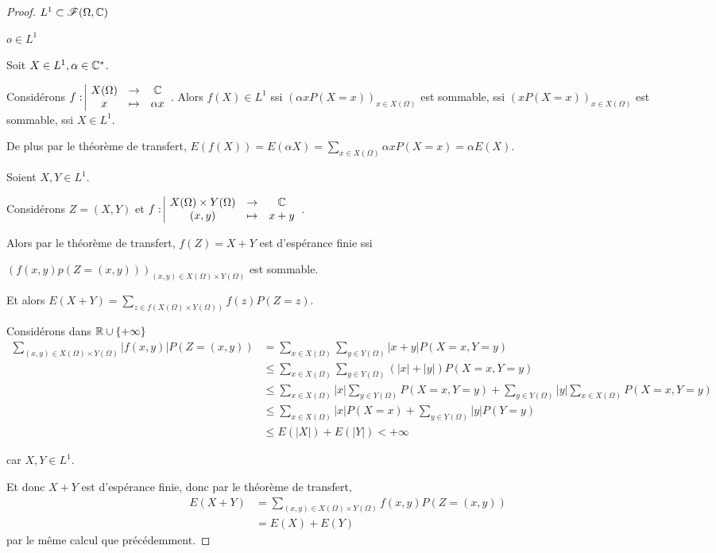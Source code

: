 \begin{proof}
    $L^1 \subset \mathscr F(\Omega, \mathbb{C})$

    $o \in L^1$

    Soit $X \in L^1, \alpha \in \mathbb{C}^*$. 

    Considérons $f: \space \begin{array}{|ccc} \displaystyle X(\Omega) & \to & \displaystyle \mathbb{C} \\ \displaystyle x & \mapsto & \displaystyle \alpha x \end{array}$.
    Alors $f(X) \in L^1$ ssi $(\alpha x P(X = x))_{x \in X(\Omega)}$ est sommable,
    ssi $(x P(X = x))_{x \in X(\Omega)}$ est sommable, ssi $X \in L^1$.

    De plus par le théorème de transfert, 
    $E(f(X)) = E(\alpha X) = \sum_{x \in X(\Omega)} \alpha x P(X = x) = \alpha E(X)$.

    \lvspace Soient $X, Y \in L^1$.

    Considérons $Z = (X, Y)$ et $f: \space \begin{array}{|ccc} \displaystyle X(\Omega) \times Y(\Omega) & \to & \displaystyle \mathbb{C} \\ \displaystyle (x, y) & \mapsto & \displaystyle x + y \end{array}$.

    Alors par le théorème de transfert, $f(Z) = X + Y$ est d'espérance finie ssi

    $(f(x, y) p(Z = (x, y)))_{(x, y) \in X(\Omega) \times Y(\Omega)}$ est sommable.

    Et alors $\displaystyle E(X + Y) = \sum_{z \in f(X(\Omega) \times Y(\Omega))} f(z) P(Z = z)$.

    Considérons dans $\mathbb{R} \cup \{+ \infty \}$ 
    \begin{align}
        \sum_{(x, y) \in X(\Omega) \times Y(\Omega)} |f(x, y)| P(Z = (x, y)) & = \sum_{x \in X(\Omega)} \sum_{y \in Y(\Omega)} |x + y| P(X = x, Y = y) \\
        & \leqslant \sum_{x \in X(\Omega)} \sum_{y \in Y(\Omega)} (|x| + |y|) P(X = x, Y = y) \\
        & \leqslant \sum_{x \in X(\Omega)} |x| \sum_{y \in Y(\Omega)} P(X = x, Y = y) + \sum_{y \in Y(\Omega)} |y| \sum_{x \in X(\Omega)} P(X = x, Y = y) \\
        & \leqslant \sum_{x \in X(\Omega)} |x| P(X = x) + \sum_{y \in Y(\Omega)} |y| P(Y = y) \\
        & \leqslant E(|X|) + E(|Y|) < + \infty
    \end{align}

    car $X, Y \in L^1$.

    Et donc $X + Y$ est d'espérance finie, donc par le théorème de transfert, 
    \begin{align}
        E(X + Y) & = \sum_{(x, y) \in X(\Omega) \times Y(\Omega)} f(x, y) P(Z = (x, y)) \\
        & = E(X) + E(Y)
    \end{align}
    par le même calcul que précédemment.
\end{proof}



